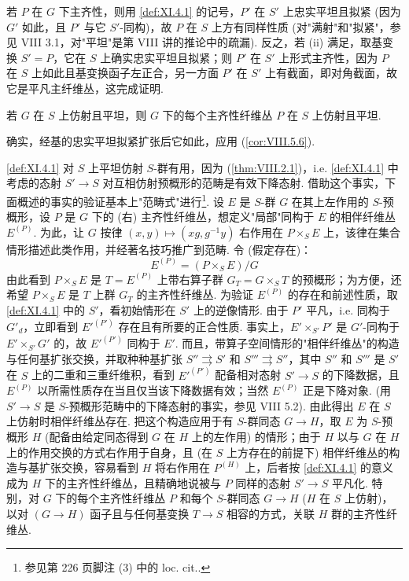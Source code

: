 若 $P$ 在 $G$ 下主齐性，则用 \ref{def:XI.4.1} 的记号，$P'$ 在 $S'$ 上忠实平坦且拟紧 (因为 $G'$ 如此，且 $P'$ 与它 $S'$-同构)，故 $P$ 在 $S$ 上方有同样性质 (对"满射"和"拟紧"，参见 VIII 3.1，对"平坦"是第 VIII 讲的推论中的疏漏). 反之，若 (ii) 满足，取基变换 $S' = P$，它在 $S$ 上确实忠实平坦且拟紧；则 $P'$ 在 $S'$ 上形式主齐性，因为 $P$ 在 $S$ 上如此且基变换函子左正合，另一方面 $P'$ 在 $S'$ 上有截面，即对角截面，故它是平凡主纤维丛，这完成证明.

\begin{corollary}\label{cor:XI.4.3}
若 $G$ 在 $S$ 上仿射且平坦，则 $G$ 下的每个主齐性纤维丛 $P$ 在 $S$ 上仿射且平坦.
\end{corollary}

确实，经基的忠实平坦拟紧扩张后它如此，应用 (\cref{cor:VIII.5.6}).

\cref{def:XI.4.1} 对 $S$ 上平坦仿射 $S$-群有用，因为 (\cref{thm:VIII.2.1})，i.e. \ref{def:XI.4.1} 中考虑的态射 $S' \to S$ 对互相仿射预概形的范畴是有效下降态射. 借助这个事实，下面概述的事实的验证基本上"范畴式"进行\footnote{参见第 226 页脚注 (3) 中的 loc. cit..}. 设 $E$ 是 $S$-群 $G$ 在其上左作用的 $S$-预概形，设 $P$ 是 $G$ 下的 (右) 主齐性纤维丛，想定义"局部"同构于 $E$ 的相伴纤维丛 $E^{(P)}$. 为此，让 $G$ 按律 $(x, y) \mapsto (xg, g^{-1}y)$ 右作用在 $P \times_S E$ 上，该律在集合情形描述此类作用，并经著名技巧推广到范畴. 令 (假定存在)：
\[
E^{(P)} = (P \times_S E)/G
\]
由此看到 $P \times_S E$ 是 $T = E^{(P)}$ 上带右算子群 $G_T = G \times_S T$ 的预概形；为方便，还希望 $P \times_S E$ 是 $T$ 上群 $G_T$ 的主齐性纤维丛. 为验证 $E^{(P)}$ 的存在和前述性质，取\cref{def:XI.4.1} 中的 $S'$，看初始情形在 $S'$ 上的逆像情形. 由于 $P'$ 平凡，i.e. 同构于 $G'_d$，立即看到 $E'^{(P')}$ 存在且有所要的正合性质. 事实上，$E' \times_{S'} P'$ 是 $G'$-同构于 $E' \times_{S'} G'$ 的，故 $E'^{(P')}$ 同构于 $E'$. 而且，带算子空间情形的"相伴纤维丛"的构造与任何基扩张交换，并取种种基扩张 $S'' \rightrightarrows S'$ 和 $S''' \rightrightarrows S''$，其中 $S''$ 和 $S'''$ 是 $S'$ 在 $S$ 上的二重和三重纤维积，看到 $E'^{(P')}$ 配备相对态射 $S' \to S$ 的下降数据，且 $E^{(P)}$ 以所需性质存在当且仅当该下降数据有效；当然 $E^{(P)}$ 正是下降对象. (用 $S' \to S$ 是 $S$-预概形范畴中的下降态射的事实，参见 VIII 5.2). 由此得出 $E$ 在 $S$ 上仿射时相伴纤维丛存在. 把这个构造应用于有 $S$-群同态 $G \to H$，取 $E$ 为 $S$-预概形 $H$ (配备由给定同态得到 $G$ 在 $H$ 上的左作用) 的情形；由于 $H$ 以与 $G$ 在 $H$ 上的作用交换的方式右作用于自身，且 (在 $S$ 上方存在的前提下) 相伴纤维丛的构造与基扩张交换，容易看到 $H$ 将右作用在 $P^{(H)}$ 上，后者按 \ref{def:XI.4.1} 的意义成为 $H$ 下的主齐性纤维丛，且精确地说被与 $P$ 同样的态射 $S' \to S$ 平凡化. 特别，对 $G$ 下的每个主齐性纤维丛 $P$ 和每个 $S$-群同态 $G \to H$ ($H$ 在 $S$ 上仿射)，以对 $(G \to H)$ 函子且与任何基变换 $T \to S$ 相容的方式，关联 $H$ 群的主齐性纤维丛.

